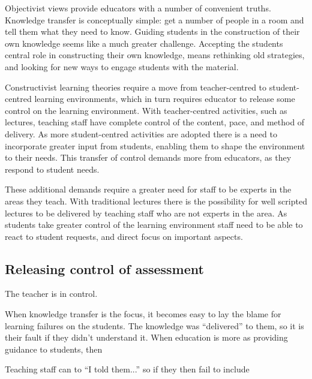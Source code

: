 Objectivist views provide educators with a number of convenient truths. Knowledge transfer is conceptually simple: get a number of people in a room and tell them what they need to know. Guiding students in the construction of their own knowledge seems like a much greater challenge. Accepting the students central role in constructing their own knowledge, means rethinking old strategies, and looking for new ways to engage students with the material. 

Constructivist learning theories require a move from teacher-centred to student-centred learning environments, which in turn requires educator to release some control on the learning environment. With teacher-centred activities, such as lectures, teaching staff have complete control of the content, pace, and method of delivery. As more student-centred activities are adopted there is a need to incorporate greater input from students, enabling them to shape the environment to their needs. This transfer of control demands more from educators, as they respond to student needs.

These additional demands require a greater need for staff to be experts in the areas they teach. With traditional lectures there is the possibility for well scripted lectures to be delivered by teaching staff who are not experts in the area. As students take greater control of the learning environment staff need to be able to react to student requests, and direct focus on important aspects.

\subsection{Releasing control of assessment} %
\label{sub:releasing_control_of_assessment}

The teacher is in control.

When knowledge transfer is the focus, it becomes easy to lay the blame for learning failures on the students. The knowledge was ``delivered'' to them, so it is their fault if they didn't understand it. When education is more as providing guidance to students, then 

Teaching staff can to  ``I told them...'' so if they then fail to include 








